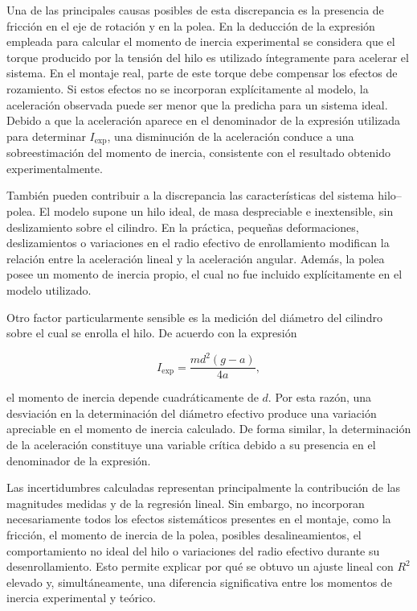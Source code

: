 \documentclass[11pt,a4paper]{article}
\begin{document}
Una de las principales causas posibles de esta discrepancia es la
presencia de fricción en el eje de rotación y en la polea. En la
deducción de la expresión empleada para calcular el momento de inercia
experimental se considera que el torque producido por la tensión del
hilo es utilizado íntegramente para acelerar el sistema. En el montaje
real, parte de este torque debe compensar los efectos de rozamiento. Si
estos efectos no se incorporan explícitamente al modelo, la aceleración
observada puede ser menor que la predicha para un sistema ideal. Debido
a que la aceleración aparece en el denominador de la expresión utilizada
para determinar \(I_{\mathrm{exp}}\), una disminución de la aceleración
conduce a una sobreestimación del momento de inercia, consistente con el
resultado obtenido experimentalmente.

También pueden contribuir a la discrepancia las características del
sistema hilo--polea. El modelo supone un hilo ideal, de masa despreciable
e inextensible, sin deslizamiento sobre el cilindro. En la práctica,
pequeñas deformaciones, deslizamientos o variaciones en el radio efectivo
de enrollamiento modifican la relación entre la aceleración lineal y la
aceleración angular. Además, la polea posee un momento de inercia propio,
el cual no fue incluido explícitamente en el modelo utilizado.

Otro factor particularmente sensible es la medición del diámetro del
cilindro sobre el cual se enrolla el hilo. De acuerdo con la expresión

\[
I_{\mathrm{exp}}
=
\frac{m d^2(g-a)}{4a},
\]

el momento de inercia depende cuadráticamente de \(d\). Por esta razón,
una desviación en la determinación del diámetro efectivo produce una
variación apreciable en el momento de inercia calculado. De forma
similar, la determinación de la aceleración constituye una variable
crítica debido a su presencia en el denominador de la expresión.

Las incertidumbres calculadas representan principalmente la contribución
de las magnitudes medidas y de la regresión lineal. Sin embargo, no
incorporan necesariamente todos los efectos sistemáticos presentes en
el montaje, como la fricción, el momento de inercia de la polea, posibles
desalineamientos, el comportamiento no ideal del hilo o variaciones del
radio efectivo durante su desenrollamiento. Esto permite explicar por
qué se obtuvo un ajuste lineal con \(R^2\) elevado y, simultáneamente,
una diferencia significativa entre los momentos de inercia experimental
y teórico.
\end{document}

